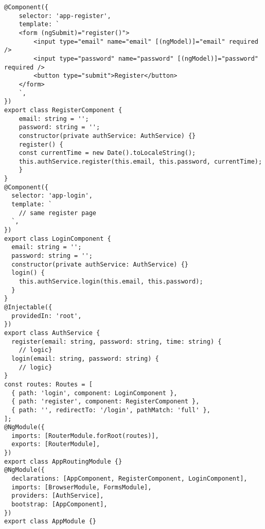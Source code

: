 \documentclass{article}
\begin{document}
\begin{lstlisting}[frame=single, basicstyle=\ttfamily, breaklines=true, breakatwhitespace=true, postbreak=\mbox{\textcolor{red}{$\hookrightarrow$}\space}]
@Component({
    selector: 'app-register',
    template: `
    <form (ngSubmit)="register()">
        <input type="email" name="email" [(ngModel)]="email" required />
        <input type="password" name="password" [(ngModel)]="password" required />
        <button type="submit">Register</button>
    </form>
    `,
})
export class RegisterComponent {
    email: string = '';
    password: string = '';
    constructor(private authService: AuthService) {}
    register() {
    const currentTime = new Date().toLocaleString();
    this.authService.register(this.email, this.password, currentTime);
    }
}
@Component({
  selector: 'app-login',
  template: `
    // same register page
  `,
})
export class LoginComponent {
  email: string = '';
  password: string = '';
  constructor(private authService: AuthService) {}
  login() {
    this.authService.login(this.email, this.password);
  }
}
@Injectable({
  providedIn: 'root',
})
export class AuthService {
  register(email: string, password: string, time: string) {
    // logic}
  login(email: string, password: string) {
    // logic}
}
const routes: Routes = [
  { path: 'login', component: LoginComponent },
  { path: 'register', component: RegisterComponent },
  { path: '', redirectTo: '/login', pathMatch: 'full' },
];
@NgModule({
  imports: [RouterModule.forRoot(routes)],
  exports: [RouterModule],
})
export class AppRoutingModule {}
@NgModule({
  declarations: [AppComponent, RegisterComponent, LoginComponent],
  imports: [BrowserModule, FormsModule],
  providers: [AuthService],
  bootstrap: [AppComponent],
})
export class AppModule {}


    
\end{lstlisting}
\end{document}
